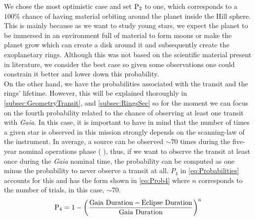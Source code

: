 We chose the most optimistic case and set $\textnormal{P}_2$ to one, which corresponds to a $100\%$ chance of having material orbiting around the planet inside the Hill sphere. This is mainly because as we want to study young stars, we expect the planet to be immersed in an environment full of material to form moons or make the planet grow which can create a disk around it and subsequently create the exoplanetary rings. Although this was not based on the scientific material present in literature, we consider the best case so given some observations one could constrain it better and lower down this probability.\\

On the other hand, we have the probabilities associated with the transit and the rings' lifetime. However, this will be explained thoroughly in \autoref{subsec:GeometryTransit}, and  \autoref{subsec:RingsSec} so for the moment we can focus on the fourth probability related to the chance of observing at least one transit with \textit{Gaia}. In this case, it is important to have in mind that the number of times a given star is observed in this mission strongly depends on the scanning-law of the instrument. In average, a source can be observed $\sim70$ times during the five-year nominal operations phase ( \citeyear{2016A&A...595A...1G}), thus, if we want to observe the transit at least once during the \textit{Gaia} nominal time, the probability can be computed as one minus the probability to never observe a transit at all. $P_4$ in \autoref{eq:Probabilities} accounts for this and has the form shown in \autoref{eq:Prob4} where $n$ corresponds to the number of trials, in this case, $\sim70$.\\ %

\begingroup
\Large
\begin{equation}
\textnormal{P}_4 = 1 - \left( \frac{\textnormal{Gaia}~\textnormal{Duration} - \textnormal{Eclipse}~\textnormal{Duration}}{\textnormal{Gaia}~\textnormal{Duration}} \right)^\textnormal{n}
 \label{eq:Prob4}
\end{equation}
\endgroup\\

